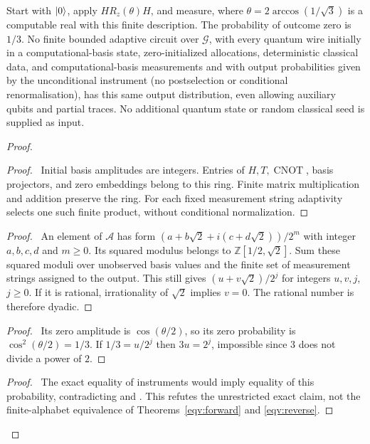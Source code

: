 \begin{counterexample}\label{eqv:exact-obstruction}
Start with $\lvert 0\rangle$, apply $H R_z(\theta)H$, and measure, where
$\theta=2\arccos(1/\sqrt3)$ is a computable real with this finite
description. The probability of outcome zero is $1/3$. No finite
bounded adaptive circuit over $\mathcal G$, with every quantum wire
initially in a computational-basis state, zero-initialized allocations,
deterministic classical data, and computational-basis measurements and with output probabilities given by the unconditional instrument (no postselection or conditional renormalisation),
has this same output distribution, even allowing auxiliary qubits and
partial traces. No additional quantum state or random classical seed
is supplied as input.
\end{counterexample}
\begin{proof}
 \begin{proof}\pf\ Initial basis amplitudes are integers. Entries
 of $H,T,\operatorname{CNOT}$, basis projectors, and zero embeddings
 belong to this ring. Finite matrix multiplication and addition
 preserve the ring. For each fixed measurement string adaptivity
 selects one such finite product, without conditional normalization.
\end{proof}
 \begin{proof}\pf\ An element of $\mathcal A$ has form
 $(a+b\sqrt2+i(c+d\sqrt2))/2^m$ with integer $a,b,c,d$ and $m\geq0$.
 Its squared modulus belongs to $\mathbb Z[1/2,\sqrt2]$. Sum these
 squared moduli over unobserved basis values and the finite set of
 measurement strings assigned to the output. This still gives
 $(u+v\sqrt2)/2^j$ for integers $u,v,j$, $j\geq0$. If it is rational,
 irrationality of $\sqrt2$ implies $v=0$. The rational number is
 therefore dyadic.\end{proof}
 \begin{proof}\pf\ Its zero amplitude is $\cos(\theta/2)$, so its
 zero probability is $\cos^2(\theta/2)=1/3$. If $1/3=u/2^j$ then
 $3u=2^j$, impossible since $3$ does not divide a power of $2$.
\end{proof}
 \qedstep
 \begin{proof}\pf\ The exact equality of instruments would imply
 equality of this probability, contradicting
  and .
 This refutes the unrestricted exact claim, not
 the finite-alphabet equivalence of Theorems~\ref{eqv:forward} and \ref{eqv:reverse}.\end{proof}
\end{proof}

